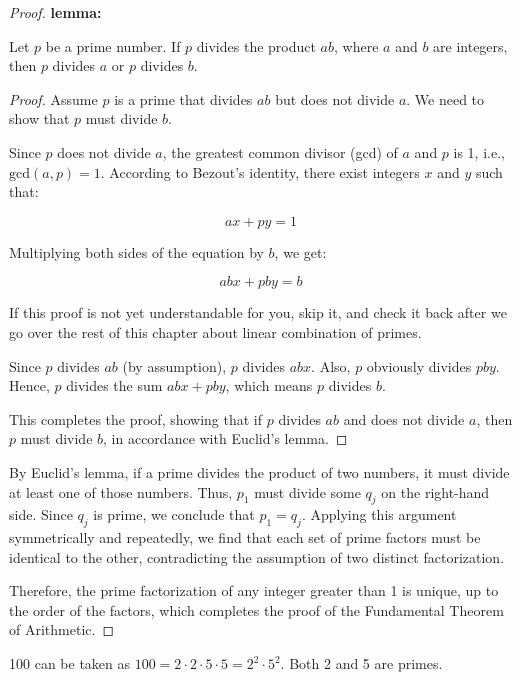 \begin{proof}
            \textbf{lemma:}

                Let \(p\) be a prime number. If \(p\) divides the product \(ab\), where \(a\) and \(b\) are integers, then \(p\) divides \(a\) or \(p\) divides \(b\).
            \begin{proof}
                Assume \(p\) is a prime that divides \(ab\) but does not divide \(a\). We need to show that \(p\) must divide \(b\).

                Since \(p\) does not divide \(a\), the greatest common divisor (gcd) of \(a\) and \(p\) is 1, i.e., \(\text{gcd}(a, p) = 1\). According to Bezout's identity, there exist integers \(x\) and \(y\) such that:

                \[ax + py = 1\]

                Multiplying both sides of the equation by \(b\), we get:

                \[abx + pby = b\]
                \begin{remark}
                    If this proof is not yet understandable for you, skip it, and check it back after we go over the rest of this chapter about linear combination of primes.
                \end{remark}
                Since \(p\) divides \(ab\) (by assumption), \(p\) divides \(abx\). Also, \(p\) obviously divides \(pby\). Hence, \(p\) divides the sum \(abx + pby\), which means \(p\) divides \(b\).

                This completes the proof, showing that if \(p\) divides \(ab\) and does not divide \(a\), then \(p\) must divide \(b\), in accordance with Euclid's lemma.
            \end{proof}
            By Euclid's lemma, if a prime divides the product of two numbers, it must divide at least one of those numbers. Thus, $p_1$ must divide some $q_j$ on the right-hand side. Since $q_j$ is prime, we conclude that $p_1 = q_j$. Applying this argument symmetrically and repeatedly, we find that each set of prime factors must be identical to the other, contradicting the assumption of two distinct factorization.
            
            Therefore, the prime factorization of any integer greater than 1 is unique, up to the order of the factors, which completes the proof of the Fundamental Theorem of Arithmetic.
            \end{proof}
            
        \begin{example}
            100 can be taken as $100 = 2\cdot 2\cdot 5\cdot 5 = 2^2\cdot 5^2$.
            Both 2 and 5 are primes.
        \end{example}

